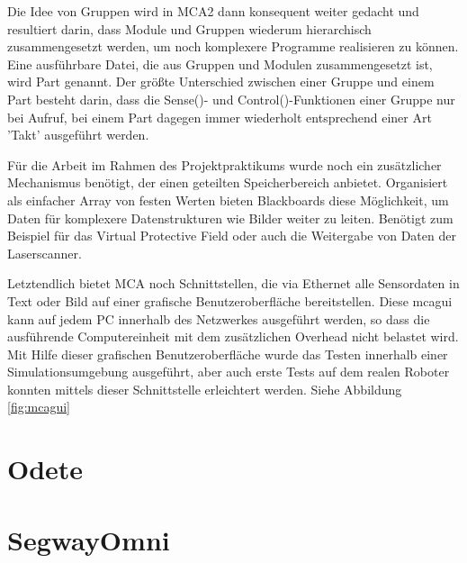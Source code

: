 Die Idee von Gruppen wird in MCA2 dann konsequent weiter gedacht und resultiert darin,
 dass Module und Gruppen wiederum hierarchisch zusammengesetzt werden, um noch komplexere Programme realisieren zu können.
 Eine ausführbare Datei, die aus Gruppen und Modulen zusammengesetzt ist, wird Part genannt.
 Der größte Unterschied zwischen einer Gruppe und einem Part besteht darin, dass die Sense()- und Control()-Funktionen einer Gruppe nur bei Aufruf,
 bei einem Part dagegen immer wiederholt entsprechend einer Art 'Takt' ausgeführt werden.

Für die Arbeit im Rahmen des Projektpraktikums wurde noch ein zusätzlicher Mechanismus benötigt,
 der einen geteilten Speicherbereich anbietet. Organisiert als einfacher Array von festen Werten bieten Blackboards diese Möglichkeit,
 um Daten für komplexere Datenstrukturen wie Bilder weiter zu leiten.
 Benötigt zum Beispiel für das Virtual Protective Field oder auch die Weitergabe von Daten der Laserscanner.

Letztendlich bietet MCA noch Schnittstellen, die via Ethernet alle Sensordaten in Text oder Bild auf einer grafische Benutzeroberfläche bereitstellen.
 Diese mcagui kann auf jedem PC innerhalb des Netzwerkes ausgeführt werden, so dass die ausführende Computereinheit
 mit dem zusätzlichen Overhead nicht belastet wird. Mit Hilfe dieser grafischen Benutzeroberfläche wurde das Testen
 innerhalb einer Simulationsumgebung ausgeführt, aber auch erste Tests auf dem realen Roboter konnten mittels dieser Schnittstelle erleichtert werden.
 Siehe Abbildung \ref{fig:mcagui}


\section{Odete}
\authorsection{\editordirk}


\section{SegwayOmni}
\authorsection{\editordirk}

